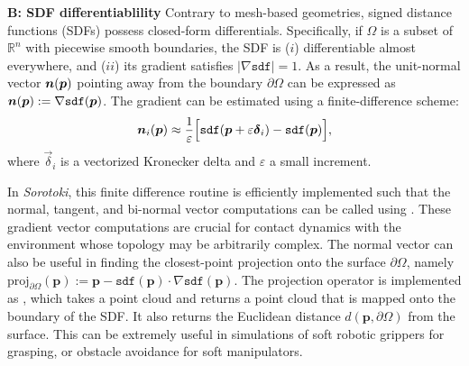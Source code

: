 \textbf{B: SDF differentiablility}
Contrary to mesh-based geometries, signed distance functions (SDFs) possess closed-form differentials. Specifically, if $\Omega$ is a subset of $\mathbb{R}^n$ with piecewise smooth boundaries, the SDF is ($i$) differentiable almost everywhere, and ($ii$) its gradient satisfies $|\nabla \texttt{sdf}| = 1$. As a result, the unit-normal vector ${\boldsymbol{n}}({\boldsymbol{p}})$ pointing away from the boundary $\partial \Omega$ can be expressed as ${\boldsymbol{n}}({\boldsymbol{p}}):= \nabla \texttt{sdf}({\boldsymbol{p}})$. The gradient can be estimated using a finite-difference scheme:
%
\begin{align}
    {\boldsymbol{n}}_{i}({\boldsymbol{p}}) \approx \frac{1}{\varepsilon} \Big[\texttt{sdf}({\boldsymbol{p}} + \varepsilon \boldsymbol{\delta}_{i}) - \texttt{sdf}({\boldsymbol{p}}) \Big],
\end{align}
%
where $\vec{\delta}_{i}$ is a vectorized Kronecker delta and $\varepsilon$ a small increment. 

In \textit{Sorotoki}, this finite difference routine is efficiently implemented such that the normal, tangent, and bi-normal vector computations can be called using . These gradient vector computations are crucial for contact dynamics with the environment whose topology may be arbitrarily complex. The normal vector can also be useful in finding the closest-point projection onto the surface $\partial \Omega$, namely $\textrm{proj}_{\partial \Omega}(\mathbf{p}):= \mathbf{p} - \texttt{sdf}(\mathbf{p}) \cdot \nabla \texttt{sdf}(\mathbf{p})$. The projection operator is implemented as , which takes a point cloud  and returns a point cloud  that is mapped onto the boundary of the SDF. It also returns the Euclidean distance $d(\mathbf{p},\partial \Omega)$ from the surface. This can be extremely useful in simulations of soft robotic grippers for grasping, or obstacle avoidance for soft manipulators.